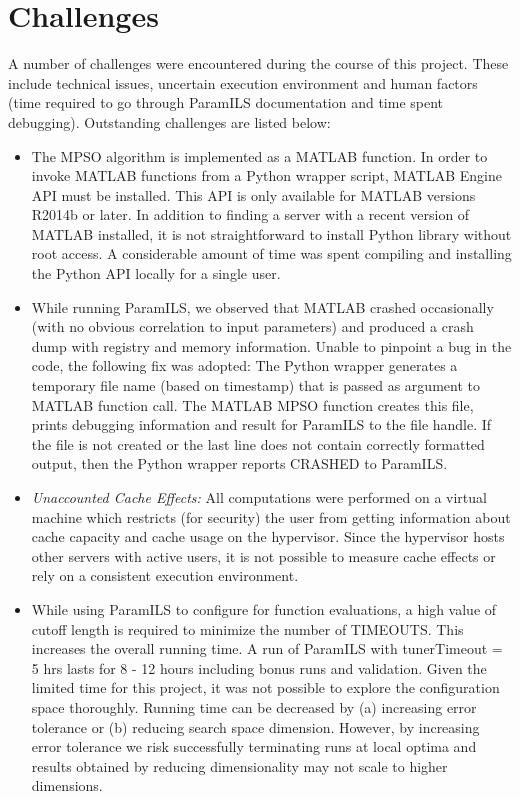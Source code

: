\section{Challenges}

A number of challenges were encountered during the course of this project. These include technical issues, uncertain execution environment and human factors (time required to go through ParamILS documentation and time spent debugging). Outstanding challenges are listed below:\\

\begin{itemize}

\item The MPSO algorithm is implemented as a MATLAB function. In order to invoke MATLAB functions from a Python wrapper script, MATLAB Engine API must be installed. This API is only available for MATLAB versions R2014b or later. In addition to finding a server with a recent version of MATLAB installed, it is not straightforward to install Python library without root access. A considerable amount of time was spent compiling and installing the Python API locally for a single user.

\item While running ParamILS, we observed that MATLAB crashed occasionally (with no obvious correlation to input parameters) and produced a crash dump with registry and memory information. Unable to pinpoint a bug in the code, the following fix was adopted: The Python wrapper generates a temporary file name (based on timestamp) that is passed as argument to MATLAB function call. The MATLAB MPSO function creates this file, prints debugging information and result for ParamILS to the file handle. If the file is not created or the last line does not contain correctly formatted output, then the Python wrapper reports CRASHED to ParamILS. 

\item {\it Unaccounted Cache Effects:} All computations were performed on a virtual machine which restricts (for security) the user from getting information about cache capacity and cache usage on the hypervisor. Since the hypervisor hosts other servers with active users, it is not possible to measure cache effects or rely on a consistent execution environment.

\item While using ParamILS to configure for function evaluations, a high value of cutoff length is required to minimize the number of TIMEOUTS. This increases the overall running time. A run of ParamILS with tunerTimeout = 5 hrs lasts for 8 - 12 hours including bonus runs and validation. Given the limited time for this project, it was not possible to explore the configuration space thoroughly. Running time can be decreased by (a) increasing error tolerance or (b) reducing search space dimension. However, by increasing error tolerance we risk successfully terminating runs at local optima and results obtained by reducing dimensionality may not scale to higher dimensions.

\end{itemize}
